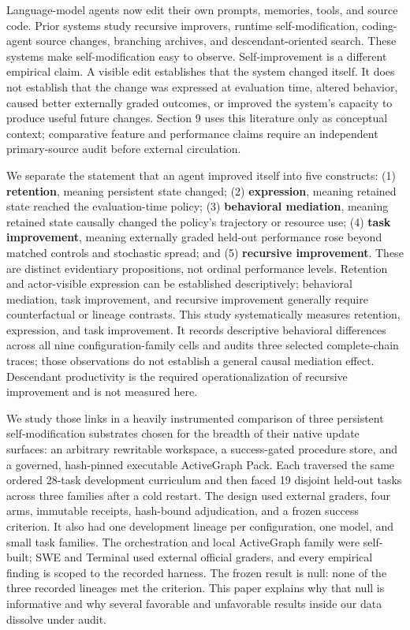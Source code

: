 \documentclass[10pt,twocolumn]{article}
\begin{document}
Language-model agents now edit their own prompts, memories, tools, and
source code. Prior systems study recursive improvers, runtime
self-modification, coding-agent source changes, branching archives, and
descendant-oriented search. These systems make self-modification easy to
observe. Self-improvement is a different empirical claim. A visible edit
establishes that the system changed itself. It does not establish that
the change was expressed at evaluation time, altered behavior, caused
better externally graded outcomes, or improved the system's capacity to
produce useful future changes. Section 9 uses this literature only as
conceptual context; comparative feature and performance claims require
an independent primary-source audit before external circulation.

We separate the statement that an agent improved itself into five
constructs: (1) \textbf{retention}, meaning persistent state changed;
(2) \textbf{expression}, meaning retained state reached the
evaluation-time policy; (3) \textbf{behavioral mediation}, meaning
retained state causally changed the policy's trajectory or resource use;
(4) \textbf{task improvement}, meaning externally graded held-out
performance rose beyond matched controls and stochastic spread; and (5)
\textbf{recursive improvement}. These are distinct evidentiary
propositions, not ordinal performance levels. Retention and
actor-visible expression can be established descriptively; behavioral
mediation, task improvement, and recursive improvement generally require
counterfactual or lineage contrasts. This study systematically measures
retention, expression, and task improvement. It records descriptive
behavioral differences across all nine configuration-family cells and
audits three selected complete-chain traces; those observations do not
establish a general causal mediation effect. Descendant productivity is
the required operationalization of recursive improvement and is not
measured here.

We study those links in a heavily instrumented comparison of three
persistent self-modification substrates chosen for the breadth of their
native update surfaces: an arbitrary rewritable workspace, a
success-gated procedure store, and a governed, hash-pinned executable
ActiveGraph Pack. Each traversed the same ordered 28-task development
curriculum and then faced 19 disjoint held-out tasks across three
families after a cold restart. The design used external graders, four
arms, immutable receipts, hash-bound adjudication, and a frozen success
criterion. It also had one development lineage per configuration, one
model, and small task families. The orchestration and local ActiveGraph
family were self-built; SWE and Terminal used external official graders,
and every empirical finding is scoped to the recorded harness. The
frozen result is null: none of the three recorded lineages met the
criterion. This paper explains why that null is informative and why
several favorable and unfavorable results inside our data dissolve under
audit.
\end{document}
